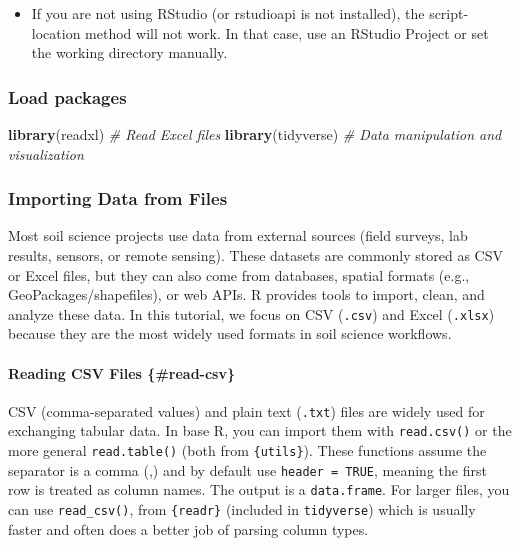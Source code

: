 \documentclass[
  10pt,
  b5paper,
  oneside]{book}
\newenvironment{Shaded}{\begin{snugshade}}{\end{snugshade}}
\newcommand{\CommentTok}[1]{\textcolor[rgb]{0.56,0.35,0.01}{\textit{#1}}}
\newcommand{\FunctionTok}[1]{\textcolor[rgb]{0.13,0.29,0.53}{\textbf{#1}}}
\newcommand{\NormalTok}[1]{#1}
\providecommand{\tightlist}{%
  \setlength{\itemsep}{0pt}\setlength{\parskip}{0pt}}
\begin{document}
\begin{itemize}
\tightlist
\item
  If you are not using RStudio (or rstudioapi is not installed), the script-location method will not work. In that case, use an RStudio Project or set the working directory manually.
\end{itemize}

\subsubsection{Load packages}\label{load-packages}

\begin{Shaded}
\begin{Highlighting}[]
\FunctionTok{library}\NormalTok{(readxl)           }\CommentTok{\# Read Excel files}
\FunctionTok{library}\NormalTok{(tidyverse)        }\CommentTok{\# Data manipulation and visualization}
\end{Highlighting}
\end{Shaded}

\subsubsection{Importing Data from Files}\label{import-files}

Most soil science projects use data from external sources (field surveys, lab results, sensors, or remote sensing). These datasets are commonly stored as CSV or Excel files, but they can also come from databases, spatial formats (e.g., GeoPackages/shapefiles), or web APIs. R provides tools to import, clean, and analyze these data. In this tutorial, we focus on CSV (\texttt{.csv}) and Excel (\texttt{.xlsx}) because they are the most widely used formats in soil science workflows.

\paragraph*{Reading CSV Files \{\#read-csv\}}\label{reading-csv-files-read-csv}

CSV (comma-separated values) and plain text (\texttt{.txt}) files are widely used for exchanging tabular data. In base R, you can import them with \texttt{read.csv()} or the more general \texttt{read.table()} (both from \texttt{\{utils\}}).
These functions assume the separator is a comma (,) and by default use \texttt{header\ =\ TRUE}, meaning the first row is treated as column names.
The output is a \texttt{data.frame}.
For larger files, you can use \texttt{read\_csv()}, from \texttt{\{readr\}} (included in \texttt{tidyverse}) which is usually faster and often does a better job of parsing column types.
\end{document}
